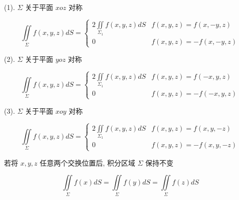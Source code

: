 \begin{definition}[普通对称性]
	(1). $\Sigma$ 关于平面 $xoz$ 对称

	$$\iint\limits_{\Sigma}f(x,y,z)dS = 
	\begin{cases}
		2\iint\limits_{\Sigma_{1}}f(x,y,z)dS & f(x,y,z) = f(x,-y,z)\\
		0                                    & f(x,y,z) = -f(x,-y,z)
	\end{cases}$$

	(2). $\Sigma$ 关于平面 $yoz$ 对称

	$$\iint\limits_{\Sigma}f(x,y,z)dS =
	\begin{cases}
		2\iint\limits_{\Sigma_{1}}f(x,y,z)dS & f(x,y,z) = f(-x,y,z)\\
		0                                    & f(x,y,z) = -f(-x,y,z)
	\end{cases}$$

	(3). $\Sigma$ 关于平面 $xoy$ 对称

	$$\iint\limits_{\Sigma}f(x,y,z)dS =
	\begin{cases}
		2\iint\limits_{\Sigma_{1}}f(x,y,z)dS & f(x,y,z) = f(x,y,-z)\\
		0                             & f(x,y,z) = -f(x,y,-z)
	\end{cases}$$
\end{definition}

\begin{definition}[轮换对称性]
	若将 $x,y,z$ 任意两个交换位置后, 积分区域 $\Sigma$ 保持不变

	$$\iint\limits_{\Sigma}f(x)dS=\iint\limits_{\Sigma}f(y)dS=\iint\limits_{\Sigma}f(z)dS$$
\end{definition}

